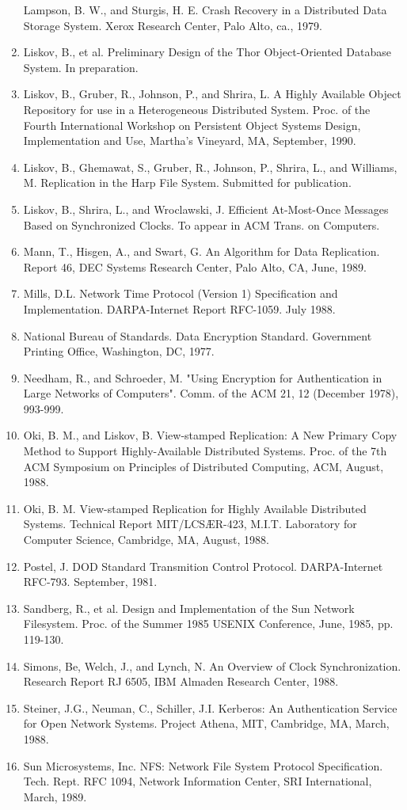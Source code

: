 \documentclass[a4paper,11pt,notitlepage,twoside,openright]{article}
\begin{document}
\begin{enumerate}
  Lampson, B. W., and Sturgis, H. E. Crash Recovery in a Distributed
  Data Storage System. Xerox Research Center, Palo Alto, ca., 1979.
\item
  Liskov, B., et al. Preliminary Design of the Thor Object-Oriented
  Database System. In preparation.
\item
  Liskov, B., Gruber, R., Johnson, P., and Shrira, L. A Highly Available
  Object Repository for use in a Heterogeneous Distributed System. Proc.
  of the Fourth International Workshop on
  Persistent Object Systems Design,
  Implementation and Use, Martha's Vineyard, MA, September, 1990.
\item
  Liskov, B., Ghemawat, S., Gruber, R., Johnson, P., Shrira, L., and
  Williams, M. Replication in the Harp File System. Submitted for
  publication.
\item
  Liskov, B., Shrira, L., and Wroclawski, J. Efficient At-Most-Once
  Messages Based on Synchronized Clocks. To appear in ACM Trans. on
  Computers.
\item
  Mann, T., Hisgen, A., and Swart, G. An Algorithm for Data Replication.
  Report 46, DEC Systems Research Center, Palo Alto, CA, June, 1989.
\item
  Mills, D.L. Network Time Protocol (Version 1) Specification and
  Implementation. DARPA-Internet Report RFC-1059. July 1988.
\item
  National Bureau of Standards. Data Encryption Standard. Government
  Printing Office, Washington, DC, 1977.
\item
  Needham, R., and Schroeder, M. "Using Encryption for Authentication in
  Large Networks of Computers". Comm. of the ACM 21, 12 (December 1978),
  993-999.
\item
  Oki, B. M., and Liskov, B. View-stamped Replication: A New Primary
  Copy Method to Support Highly-Available Distributed Systems. Proc. of
  the 7th ACM Symposium on Principles of Distributed Computing, ACM,
  August, 1988.
\item
  Oki, B. M. View-stamped Replication for Highly Available Distributed
  Systems. Technical Report MIT/LCSÆR-423, M.I.T. Laboratory for
  Computer Science, Cambridge, MA, August, 1988.
\item
  Postel, J. DOD Standard Transmition Control Protocol. DARPA-Internet
  RFC-793. September, 1981.
\item
  Sandberg, R., et al. Design and Implementation of the Sun Network
  Filesystem. Proc. of the Summer 1985 USENIX Conference, June, 1985,
  pp. 119-130.
\item
  Simons, Be, Welch, J., and Lynch, N. An Overview of Clock
  Synchronization. Research Report RJ 6505, IBM Almaden Research Center,
  1988.
\item
  Steiner, J.G., Neuman, C., Schiller, J.I. Kerberos: An Authentication
  Service for Open Network Systems. Project Athena, MIT, Cambridge, MA,
  March, 1988.
\item
  Sun Microsystems, Inc. NFS: Network File System Protocol
  Specification. Tech. Rept. RFC 1094, Network Information Center, SRI
  International, March, 1989.
\end{enumerate}
\end{document}
